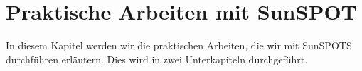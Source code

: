 \chapter{Praktische Arbeiten mit SunSPOT}\label{c:PraktischeArbeiten}

In diesem Kapitel werden wir die praktischen Arbeiten, die wir mit SunSPOTS durchführen erläutern. Dies wird in zwei Unterkapiteln durchgeführt.


